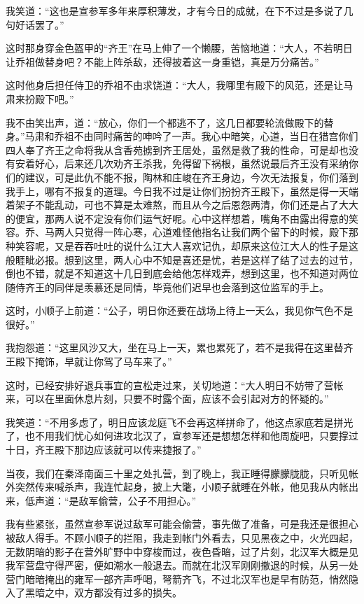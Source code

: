 我笑道：“这也是宣参军多年来厚积薄发，才有今日的成就，在下不过是多说了几句好话罢了。”

这时那身穿金色盔甲的“齐王”在马上伸了一个懒腰，苦恼地道：“大人，不若明日让乔祖做替身吧？不能上阵杀敌，还得披着这一身重铠，真是万分痛苦。”

这时他身后担任侍卫的乔祖不由求饶道：“大人，我哪里有殿下的风范，还是让马肃来扮殿下吧。”

我不由笑出声，道：“放心，你们一个都逃不了，这几日都要轮流做殿下的替身。”马肃和乔祖不由同时痛苦的呻吟了一声。我心中暗笑，心道，当日在猎宫你们四人奉了齐王之命将我从含香苑掳到齐王居处，虽然是救了我的性命，可是却也没有安着好心，后来还几次劝齐王杀我，免得留下祸根，虽然说最后齐王没有采纳你们的建议，可是此仇不能不报，陶林和庄峻在齐王身边，今次无法报复，你们落到我手上，哪有不报复的道理。今日我不过是让你们扮扮齐王殿下，虽然是得一天端着架子不能乱动，可也不算是太难熬，而且从今之后恩怨两清，你们还是占了大大的便宜，那两人说不定没有你们运气好呢。心中这样想着，嘴角不由露出得意的笑容。乔、马两人只觉得一阵心寒，心道难怪他指名让我们两个留下的时候，殿下那种笑容呢，又是吞吞吐吐的说什么江大人喜欢记仇，却原来这位江大人的性子是这般睚眦必报。想到这里，两人心中不知是喜还是忧，若是这样了结了过去的过节，倒也不错，就是不知道这十几日到底会给他怎样戏弄，想到这里，也不知道对两位随侍齐王的同伴是羡慕还是同情，毕竟他们迟早也会落到这位监军的手上。

这时，小顺子上前道：“公子，明日你还要在战场上待上一天么，我见你气色不是很好。”

我抱怨道：“这里风沙又大，坐在马上一天，累也累死了，若不是我得在这里替齐王殿下掩饰，早就让你驾了马车来了。”

这时，已经安排好退兵事宜的宣松走过来，关切地道：“大人明日不妨带了营帐来，可以在里面休息片刻，只要不时露个面，应该不会引起对方的怀疑的。”

我笑道：“不用多虑了，明日应该龙庭飞不会再这样拼命了，他这点家底若是拼光了，也不用我们忧心如何进攻北汉了，宣参军还是想想怎样和他周旋吧，只要撑过十日，齐王殿下那边应该就可以传来捷报了。”

当夜，我们在秦泽南面三十里之处扎营，到了晚上，我正睡得朦朦胧胧，只听见帐外突然传来喊杀声，我连忙起身，披上大氅，小顺子就睡在外帐，他见我从内帐出来，低声道：“是敌军偷营，公子不用担心。”

我有些紧张，虽然宣参军说过敌军可能会偷营，事先做了准备，可是我还是很担心被敌人得手。不顾小顺子的拦阻，我走到帐门外看去，只见黑夜之中，火光四起，无数阴暗的影子在营外旷野中中穿梭而过，夜色昏暗，过了片刻，北汉军大概是见我军营盘守得严密，便如潮水一般退去。而就在北汉军刚刚撤退的时候，从另一处营门暗暗掩出的雍军一部齐声呼喝，弩箭齐飞，不过北汉军也是早有防范，悄然隐入了黑暗之中，双方都没有过多的损失。

